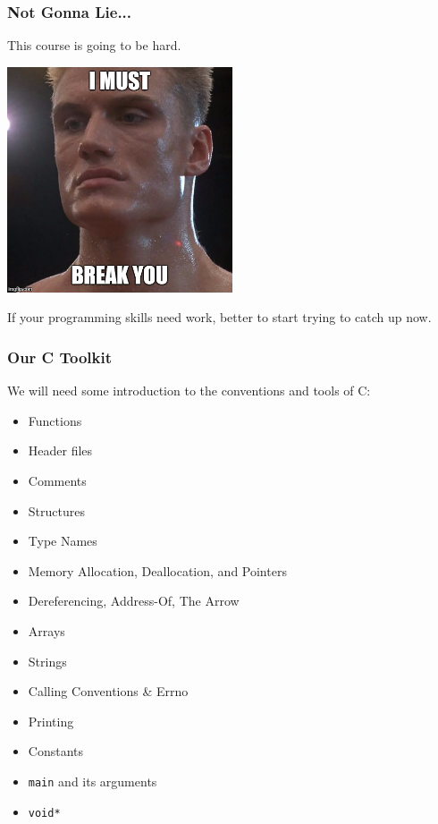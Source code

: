 \begin{frame}
\frametitle{Not Gonna Lie...}

This course is going to be hard.

\begin{center}
	\includegraphics[width=0.5\textwidth]{images/drago.jpg}
\end{center}

If your programming skills need work, better to start trying to catch up now.

\end{frame}


\begin{frame}
\frametitle{Our C Toolkit}

We will need some introduction to the conventions and tools of C:
\begin{itemize}
	\item Functions
	\item Header files
	\item Comments
	\item Structures
	\item Type Names
	\item Memory Allocation, Deallocation, and Pointers
	\item Dereferencing, Address-Of, The Arrow
	\item Arrays
	\item Strings
	\item Calling Conventions \& Errno
	\item Printing
	\item Constants
	\item \texttt{main} and its arguments
	\item \texttt{void*}
\end{itemize}


\end{frame}






